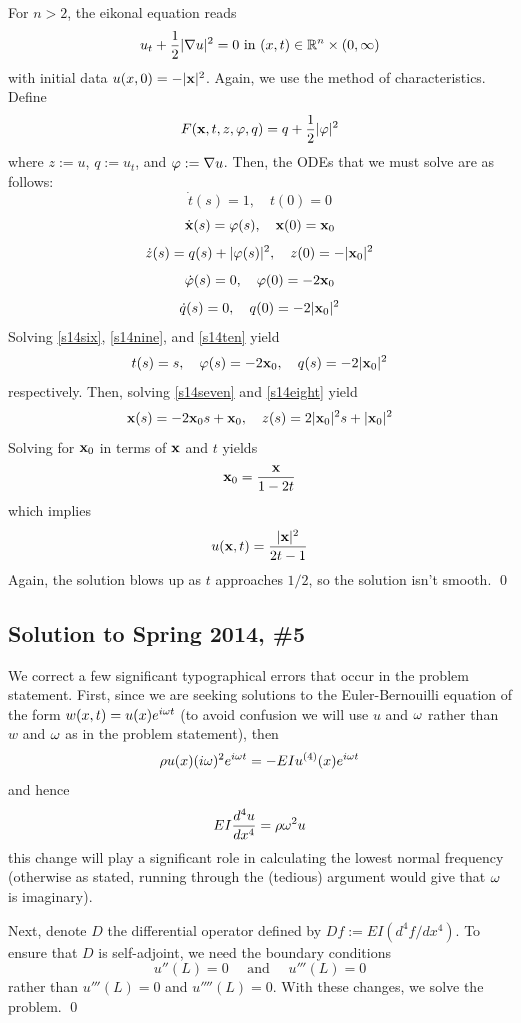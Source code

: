 For $n>2$, the eikonal equation reads
\[
u_t + \frac{1}{2} |\nabla u|^2 = 0 \,\, \text{in} \,\, (x,t) \in \mathbb{R}^n \times (0, \infty)
\]
with initial data $u(x,0) = -|\textbf{x}|^2$. Again, we use the method of characteristics. Define
\[
F(\textbf{x},t,z,\varphi,q) = q + \frac{1}{2}|\varphi|^2
\]
where $z:=u$, $q:=u_t$, and $\varphi:=\nabla u$. Then, the ODEs that we must solve are as follows:
\begin{equation}
	\label{s14six}
	\dot t(s) = 1, \quad t(0) = 0	
\end{equation}
\begin{equation}
	\label{s14seven}
	\dot {\textbf{x}}(s) = \varphi(s), \quad \textbf{x}(0) = \textbf{x}_0
\end{equation}
\begin{equation}
	\label{s14eight}
	\dot z(s) = q(s) + |\varphi(s)|^2, \quad z(0) = -|\textbf{x}_0|^2
\end{equation}
\begin{equation}
	\label{s14nine}
	\dot {\varphi}(s) = 0, \quad \varphi(0)=-2\textbf{x}_0
\end{equation}
\begin{equation}
	\label{s14ten}
	\dot q(s) = 0, \quad q(0) = -2|\textbf{x}_0|^2
\end{equation}
Solving \eqref{s14six}, \eqref{s14nine}, and \eqref{s14ten} yield
\[
t(s) = s, \quad \varphi(s) = -2\textbf{x}_0, \quad q(s) = -2|\textbf{x}_0|^2
\]
respectively. Then, solving \eqref{s14seven} and \eqref{s14eight} yield
\[
\textbf{x}(s) = -2\textbf{x}_0 s + \textbf{x}_0, \quad z(s) = 2|\textbf{x}_0|^2 s + |\textbf{x}_0|^2
\]
Solving for $\textbf{x}_0$ in terms of $\textbf{x}$ and $t$ yields
\[
\textbf{x}_0 = \frac{\textbf{x}}{1-2t}
\]
which implies
\[
u(\textbf{x},t) = \frac{|\textbf{x}|^2}{2t-1}
\]
Again, the solution blows up as $t$ approaches $1/2$, so the solution isn't smooth. \hfill\qed

\subsection*{Solution to Spring 2014, \#5}\label{s145}
\begin{rem}
We correct a few significant typographical errors that occur in the problem statement. First, since we are seeking solutions to the Euler-Bernouilli equation
of the form $w(x, t) = u(x)e^{i\omega t}$ (to avoid confusion we will use $u$ and $\omega$ rather than $w$ and $\omega$ as in the problem statement), then
$$\rho u(x)(i\omega)^{2}e^{i\omega t} = -EIu^{(4)}(x)e^{i\omega t}$$
and hence
\begin{align}\label{s14first}
EI\frac{d^{4}u}{dx^{4}} = \rho\omega^{2} u
\end{align}
this change will play a significant role in calculating the lowest normal frequency (otherwise as stated, running through the (tedious) argument would give that $\omega$ is imaginary).

Next, denote $D$ the differential operator defined by $Df := EI(d^4f/dx^{4})$. To ensure that $D$ is self-adjoint, we need the boundary conditions
$$u''(L) = 0 \quad \text{ and } \quad u'''(L) = 0$$
rather than $u'''(L) = 0$ and $u''''(L) = 0$. With these changes, we solve the problem. \hfill\qed
\end{rem}

